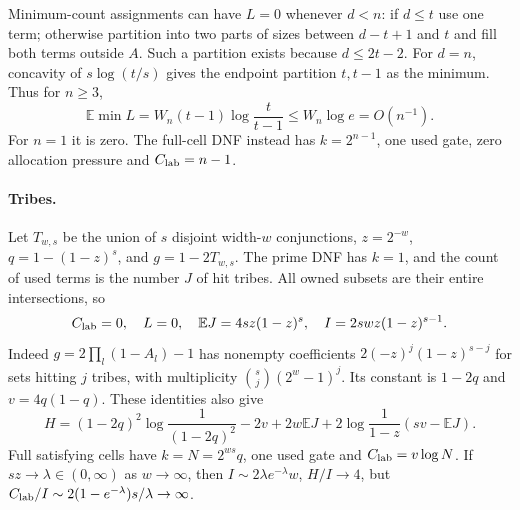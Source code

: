 \documentclass[11pt]{article}
\newcommand{\E}{\mathbb E}
\begin{document}
Minimum-count assignments can have $L=0$ whenever $d<n$: if $d\le t$ use one term;
otherwise partition into two parts of sizes between $d-t+1$ and $t$ and fill both terms outside $A$.
Such a partition exists because $d\le2t-2$.
For $d=n$, concavity of $s\log(t/s)$ gives the endpoint partition $t,t-1$ as the minimum.
Thus for $n\ge3$,
\[
 \E\min L=W_n(t-1)\log\frac{t}{t-1}\le W_n\log e=O(n^{-1}).
\]
For $n=1$ it is zero. The full-cell DNF instead has $k=2^{n-1}$, one used gate,
zero allocation pressure and $C_{\rm lab}=n-1$.

\paragraph{Tribes.} Let $T_{w,s}$ be the union of $s$ disjoint width-$w$ conjunctions,
$z=2^{-w}$, $q=1-(1-z)^s$, and $g=1-2T_{w,s}$.
The prime DNF has $k=1$, and the count of used terms is the number $J$ of hit tribes.
All owned subsets are their entire intersections, so
\[
 C_{\rm lab}=0,\quad L=0,\quad
 \E J=4sz(1-z)^s,\quad I=2swz(1-z)^{s-1}.
\]
Indeed $g=2\prod_l(1-A_l)-1$ has nonempty coefficients
$2(-z)^j(1-z)^{s-j}$ for sets hitting $j$ tribes, with multiplicity
$\binom sj(2^w-1)^j$. Its constant is $1-2q$ and $v=4q(1-q)$.
These identities also give
\[
 H=(1-2q)^2\log\frac1{(1-2q)^2}-2v+2w\E J
       +2\log\frac1{1-z}(sv-\E J).
\]
Full satisfying cells have $k=N=2^{ws}q$, one used gate and
$C_{\rm lab}=v\log N$. If $sz\to\lambda\in(0,\infty)$ as $w\to\infty$,
then $I\sim2\lambda e^{-\lambda}w$, $H/I\to4$, but
$C_{\rm lab}/I\sim2(1-e^{-\lambda})s/\lambda\to\infty$.
\end{document}
